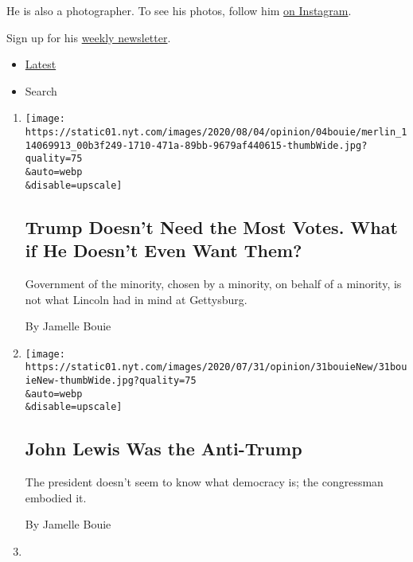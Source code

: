 He is also a photographer. To see his photos, follow him
\href{https://www.instagram.com/jbouie/?hl=en}{on Instagram}.

Sign up for his
\href{https://www.nytimes.com/newsletters/jamellebouie}{weekly
newsletter}.

\begin{itemize}
\tightlist
\item
  \protect\hyperlink{stream-panel}{Latest}
\item
  Search
\end{itemize}

\begin{enumerate}
\def\labelenumi{\arabic{enumi}.}
\item
  \href{/2020/08/04/opinion/trump-2020-electoral-college.html}{}

  \texttt{[image: https://static01.nyt.com/images/2020/08/04/opinion/04bouie/merlin\_114069913\_00b3f249-1710-471a-89bb-9679af440615-thumbWide.jpg?quality=75\\\&auto=webp\\\&disable=upscale]}

  \hypertarget{trump-doesnt-need-the-most-votes-what-if-he-doesnt-even-want-them}{%
  \subsection{Trump Doesn't Need the Most Votes. What if He Doesn't Even
  Want
  Them?}\label{trump-doesnt-need-the-most-votes-what-if-he-doesnt-even-want-them}}

  Government of the minority, chosen by a minority, on behalf of a
  minority, is not what Lincoln had in mind at Gettysburg.

  By Jamelle Bouie
\item
  \href{/2020/07/31/opinion/sunday/john-lewis-trump-election-2020.html}{}

  \texttt{[image: https://static01.nyt.com/images/2020/07/31/opinion/31bouieNew/31bouieNew-thumbWide.jpg?quality=75\\\&auto=webp\\\&disable=upscale]}

  \hypertarget{john-lewis-was-the-anti-trump}{%
  \subsection{John Lewis Was the
  Anti-Trump}\label{john-lewis-was-the-anti-trump}}

  The president doesn't seem to know what democracy is; the congressman
  embodied it.

  By Jamelle Bouie
\item
  \href{/2020/07/24/opinion/trump-silent-majority.html}{}


\end{enumerate}
